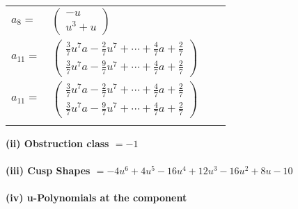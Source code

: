 \documentclass[1p]{elsarticle_modified}
\theoremstyle{definition}
\begin{document}
\begin{tabular}{m{7pt} m{180pt} m{7pt} m{180pt} }
\flushright $a_{8}=$&$\begin{pmatrix}- u\\u^3+u\end{pmatrix}$ \\
\flushright $a_{11}=$&$\begin{pmatrix}\frac{3}{7} u^7 a-\frac{2}{7} u^7+\cdots+\frac{4}{7} a+\frac{2}{7}\\\frac{3}{7} u^7 a-\frac{9}{7} u^7+\cdots+\frac{4}{7} a+\frac{2}{7}\end{pmatrix}$\\ \flushright $a_{11}=$&$\begin{pmatrix}\frac{3}{7} u^7 a-\frac{2}{7} u^7+\cdots+\frac{4}{7} a+\frac{2}{7}\\\frac{3}{7} u^7 a-\frac{9}{7} u^7+\cdots+\frac{4}{7} a+\frac{2}{7}\end{pmatrix}$\\&\end{tabular}
\flushleft \textbf{(ii) Obstruction class $= -1$}\\~\\
\flushleft \textbf{(iii) Cusp Shapes $= -4 u^6+4 u^5-16 u^4+12 u^3-16 u^2+8 u-10$}\\~\\
\newpage\renewcommand{\arraystretch}{1}
\flushleft \textbf{(iv) u-Polynomials at the component}\newline \\
\end{document}
